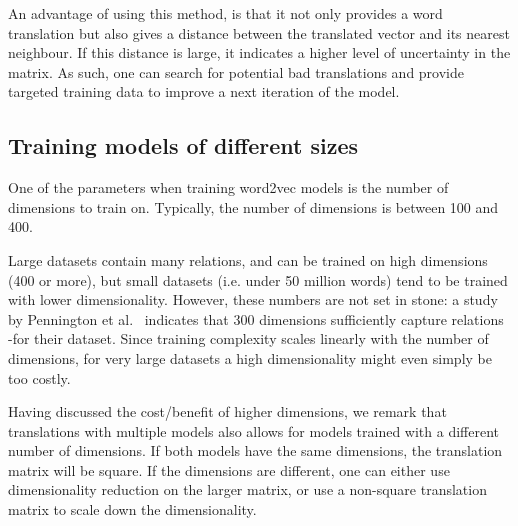 An advantage of using this method, is that it not only provides a word translation but also gives a distance between the translated vector and its nearest neighbour. If this distance is large, it indicates a higher level of uncertainty in the matrix. As such, one can search for potential bad translations and provide targeted training data to improve a next iteration of the model.

\subsection{Training models of different sizes}
One of the parameters when training word2vec models is the number of dimensions to train on. Typically, the number of dimensions is between 100 and 400\cite{mikolov2013efficient}.

Large datasets contain many relations, and can be trained on high dimensions (400 or more), but small datasets (i.e. under 50 million words) tend to be trained with lower dimensionality. However, these numbers are not set in stone: a study by Pennington et al.~\cite{jeffreypennington2014glove} indicates that 300 dimensions sufficiently capture relations -for their dataset. Since training complexity scales linearly with the number of dimensions, for very large datasets a high dimensionality might even simply be too costly.

Having discussed the cost/benefit of higher dimensions, we remark that translations with multiple models also allows for models trained with a different number of dimensions. If both models have the same dimensions, the translation matrix will be square. If the dimensions are different, one can either use dimensionality reduction on the larger matrix, or use a non-square translation matrix to scale down the dimensionality.